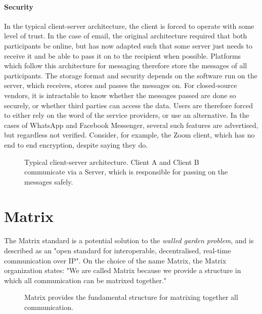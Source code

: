 \paragraph{Security}
In the typical client-server architecture, the client is forced to operate with some level of trust.
In the case of email, the original architecture required that both participants be online, but has now adapted such that some server just needs to receive it and be able to pass it on to the recipient when possible\cite{tomlinson2009first}.
Platforms which follow this architecture for messaging therefore store the messages of all participants.
The storage format and security depends on the software run on the server, which receives, stores and passes the messages on.
For closed-source vendors, it is intractable to know whether the messages passed are done so securely, or whether third parties can access the data.
Users are therefore forced to either rely on the word of the service providers, or use an alternative.
In the cases of WhatsApp and Facebook Messenger, several such features are advertised, but regardless not verified\cite{twitter_comms_protocol_comparison}.
Consider, for example, the Zoom client, which has no end to end encryption, despite saying they do\cite{zoom_e2ee_or_not}.

\begin{figure}
    \centering
    \resizebox{0.7\linewidth}{!}{}
    \caption{
        Typical client-server architecture.
        Client A and Client B communicate via a Server, which is responsible for passing on the messages safely.
    }
    \label{fig:client_server}
\end{figure}

\section{Matrix}
The Matrix standard is a potential solution to the \textit{walled garden problem}, and is described as an "open standard for interoperable, decentralised, real-time communication over IP"\cite{matrix_org}.
On the choice of the name Matrix, the Matrix organization states: "We are called Matrix because we provide a structure in which all communication can be matrixed together."\cite{matrix_org_faq}

\begin{figure}[]
    \centering
    \caption{Matrix provides the fundamental structure for matrixing together all communication.}
    \label{fig:matrixing_together}
\end{figure}

